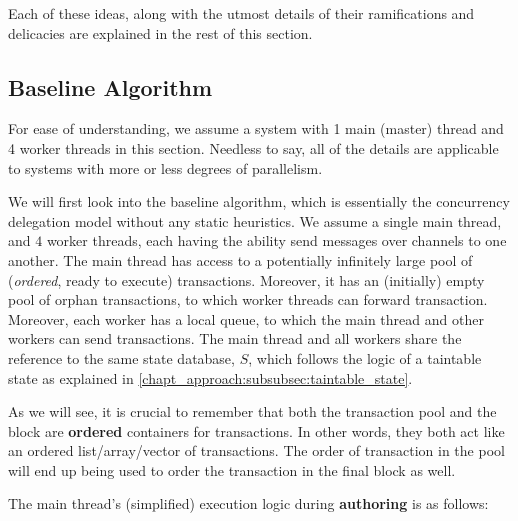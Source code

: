 Each of these ideas, along with the utmost details of their ramifications and delicacies are
explained in the rest of this section.

\subsection{Baseline Algorithm}

\begin{remark}
	For ease of understanding, we assume a system with 1 main (master) thread and 4 worker threads
	in this section. Needless to say, all of the details are applicable to systems with more or less
	degrees of parallelism.
\end{remark}

We will first look into the baseline algorithm, which is essentially the concurrency delegation
model without any static heuristics. We assume a single main thread, and $4$ worker threads, each having
the ability send messages over channels to one another. The main thread has access to a potentially
infinitely large pool of (\textit{ordered}, ready to execute) transactions. Moreover, it has an
(initially) empty pool of orphan transactions, to which worker threads can forward transaction.
Moreover, each worker has a local queue, to which the main thread and other workers can send
transactions. The main thread and all workers share the reference to the same state database, $S$,
which follows the logic of a taintable state as explained in
\ref{chapt_approach:subsubsec:taintable_state}.

\begin{remark}
	As we will see, it is crucial to remember that both the transaction pool and the block are
	\textbf{ordered} containers for transactions. In other words, they both act like an ordered
	list/array/vector of transactions. The order of transaction in the pool will end up being used
	to order the transaction in the final block as well. 
\end{remark}

The main thread's (simplified) execution logic during \textbf{authoring} is as follows:

